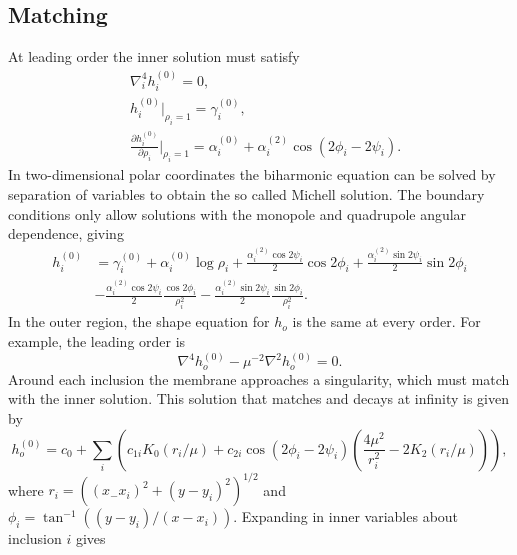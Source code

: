 \subsection{Matching}
At leading order the inner solution must satisfy
\begin{align}
    &\nabla_i^{4}h_i^{(0)}=0,  \\
    &h_i^{(0)}\biggr\rvert_{\rho_i=1}=\gamma_i^{(0)}, \\
    &\frac{\partial h_i^{(0)}}{\partial \rho_i}\biggr\rvert_{\rho_i=1}=\alpha_i^{(0)}+\alpha_i^{(2)}\cos(2\phi_i-2\psi_i).
\end{align}
 In two-dimensional polar coordinates the biharmonic equation can be solved by separation of variables to obtain the so called  Michell solution. The boundary conditions only allow solutions with the monopole and quadrupole angular dependence, giving
\begin{equation}
    \begin{split}
    h_i^{(0)} &= \gamma_i^{(0)} + \alpha_i^{(0)}\log\rho_i + \frac{\alpha_i^{(2)}\cos 2\psi_i}{2}\cos 2\phi_i + \frac{\alpha_i^{(2)}\sin 2\psi_i}{2}\sin 2\phi_i \\
    &-\frac{\alpha_i^{(2)}\cos 2\psi_i}{2}\frac{\cos 2\phi_i}{\rho_i^2} - \frac{\alpha_i^{(2)}\sin 2\psi_i}{2}\frac{\sin 2\phi_i}{\rho_i^2}.
    \end{split}
\end{equation}
In the outer region, the shape equation for $h_o$ is the same at every order. For example, the leading order is
\begin{equation}
    \nabla^{4}h_o^{(0)}-\mu^{-2}\nabla^{2}h_o^{(0)}=0.  
\end{equation}
Around each inclusion the membrane approaches a singularity, which must match with the inner solution. This solution that matches and decays at infinity is given by
\begin{equation}
    h_o^{(0)} = c_0 + \sum_i \left( c_{1i} K_0(r_i/\mu) + c_{2i} \cos(2\phi_i-2\psi_i)\left(\frac{4\mu^{2}}{r_i^2} - 2 K_2(r_i/\mu)\right) \right),
\end{equation}
where $r_i = ((x_ - x_i)^2+(y - y_i)^2)^{1/2}$ and $\phi_i = \tan^{-1}((y - y_i)/(x - x_i))$. Expanding in inner variables about inclusion $i$ gives
